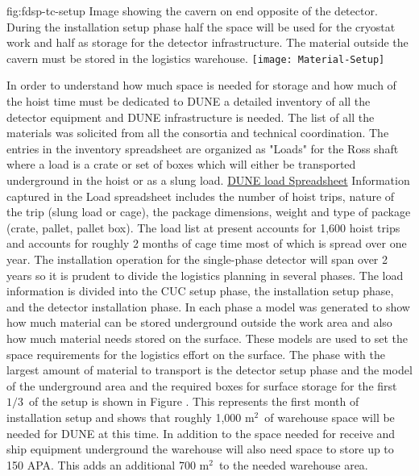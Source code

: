 \begin{dunefigure}{fig:fdsp-tc-setup}
  {Image showing the cavern on end opposite of the detector. During the installation setup phase half the space will be used for the cryostat work and half as storage for the detector infrastructure. The material outside the cavern must be stored in the logistics warehouse.}
\texttt{[image: Material-Setup]}
\end{dunefigure}
%

In order to understand how much space is needed for storage and how much of the hoist time must be dedicated to DUNE a detailed inventory of all the detector equipment and DUNE infrastructure is needed. The list of all the materials was solicited from all the consortia and technical coordination. The entries in the inventory spreadsheet are organized as "Loads" for the Ross shaft where a load is a crate or set of boxes which will either be transported underground in the hoist or as a slung load. \href{http://docs.dunescience.org/cgi-bin/ShowDocument?docid=8426}{DUNE load Spreadsheet} \cite{bib:docdb8426}
 Information captured in the Load spreadsheet includes the number of hoist trips, nature of the trip (slung load or cage), the package dimensions, weight and type of package (crate, pallet, pallet box). The load list at present accounts for 1,600 hoist trips and accounts for roughly 2 months of cage time most of which is spread over one year. The installation operation for the single-phase detector will span over 2 years so it is prudent to divide the logistics planning in several phases. The load information is divided into the CUC setup phase, the installation setup phase, and the detector installation phase. In each phase a model was generated to show how much material can be stored underground outside the work area and also how much material needs stored on the surface. These models are used to set the space requirements for the logistics effort on the surface. The phase with the largest amount of material to transport is the detector setup phase and the model of the underground area and the required boxes for surface storage for the first $1/3$\ of the setup is shown in Figure \cite{bib:docdb8426}. This represents the first month of installation setup and shows that roughly 1,000 m$^2$\ of warehouse space will be needed for DUNE at this time. In addition to the space needed for receive and ship equipment underground the warehouse will also need space to store up to 150 APA. This adds an additional 700 m$^2$\ to the needed warehouse area. 


